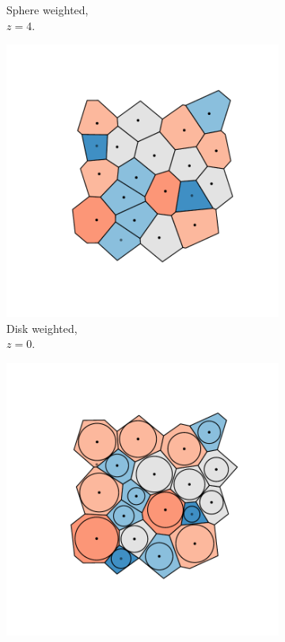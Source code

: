 \begin{figure}[tb]
\begin{subfigure}[b]{0.23\textwidth}
         \caption{Sphere weighted, \\$z=4$.}
         \label{fig:cut40a}
     \end{subfigure}
     \hfill
     \vspace{0.2cm}
     
      \begin{subfigure}[b]{0.23\textwidth}
         \centering
         \includegraphics[width=\textwidth]{./figures/quasi2d/cut_z0_b.pdf}
         \caption{Disk weighted, \\$z=0$.}
         \label{fig:cut0b}
     \end{subfigure}
     \hfill
      \begin{subfigure}[b]{0.23\textwidth}
         \centering
         \includegraphics[width=\textwidth]{./figures/quasi2d/cut_z10_b.pdf}

\end{subfigure}
\end{figure}

